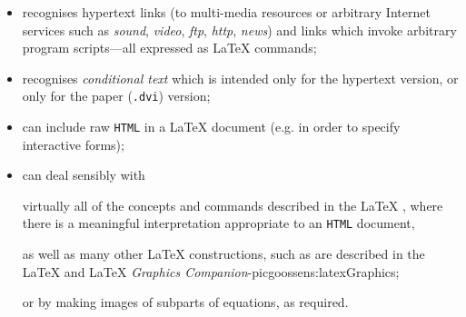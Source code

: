 \begin{itemize}
%
%
%
\item 
recognises hypertext links (to multi-media resources or
arbitrary Internet services such as 
\textsl{sound}, \textsl{video}, \textsl{ftp}, \textsl{http}, \textsl{news}) and
links which invoke arbitrary program scripts---all expressed as \LaTeX{}  
commands;

%
\item 
recognises \emph{conditional text}  which is intended only for
the hypertext version, or only for the paper (\texttt{.dvi}) version;\par
%
%
%
\item 
can include raw \texttt{HTML} in a \LaTeX{}  document 
(e.g. in order to specify interactive forms);

\label{hypcites}%
%
%
\item 
can deal sensibly with 
%
\begin{changebar}%
virtually all of the concepts and commands described in
the \LaTeX{} , 
where there is a meaningful interpretation appropriate to
an \texttt{HTML} document,
\end{changebar}
as well as many other \LaTeX{} constructions, such as are described in the 
\LaTeX{} 
and \LaTeX{} %
{\textit{Graphics Companion}}{\Xy-pic}{goossens:latexGraphics};

%
%
%
%
%
%
\begin{changebar}%
or by making images of subparts of equations, as required.
\end{changebar}


\end{itemize}
